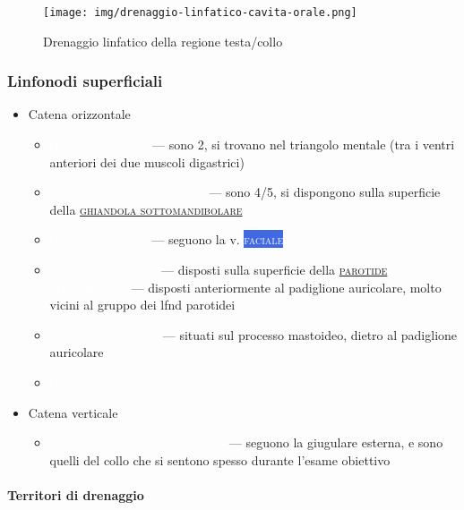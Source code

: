 \documentclass[italian,]{article}
\providecommand{\tightlist}{%
  \setlength{\itemsep}{0pt}\setlength{\parskip}{0pt}}
\newcommand{\ven}[1]{\colorbox{RoyalBlue}{\textcolor{white}{\textsc{#1}}}}
\newcommand{\lin}[1]{\colorbox{PineGreen}{\textcolor{white}{\textsc{#1}}}}
\renewcommand{\a}[1]{\underline{\textsc{#1}}}
\begin{document}
\begin{figure}
\centering
\texttt{[image: img/drenaggio-linfatico-cavita-orale.png]}
\caption{Drenaggio linfatico della regione testa/collo}
\end{figure}

\hypertarget{linfonodi-superficiali}{%
\subsubsection{Linfonodi superficiali}\label{linfonodi-superficiali}}

\begin{itemize}
\tightlist
\item
  Catena orizzontale

  \begin{itemize}
  \tightlist
  \item
    \lin{linfonodi mentali} --- sono 2, si trovano nel triangolo mentale
    (tra i ventri anteriori dei due muscoli digastrici)
  \item
    \lin{linfonodi sottomandibolari} --- sono 4/5, si dispongono sulla
    superficie della \a{ghiandola sottomandibolare}
  \item
    \lin{linfonodi buccali} --- seguono la v. \ven{faciale}
  \item
    \lin{linfonodi parotidei} --- disposti sulla superficie della
    \a{parotide} \lin{linfonodi preauricolari} --- disposti
    anteriormente al padiglione auricolare, molto vicini al gruppo dei
    lfnd parotidei
  \item
    \lin{linfonodi mastoidei} --- situati sul processo mastoideo, dietro
    al padiglione auricolare
  \item
    \lin{linfonodi occipitali}~
  \end{itemize}
\item
  Catena verticale

  \begin{itemize}
  \tightlist
  \item
    \lin{linfonodi cervicali superficiali} --- seguono la giugulare
    esterna, e sono quelli del collo che si sentono spesso durante
    l'esame obiettivo
  \end{itemize}
\end{itemize}

\hypertarget{territori-di-drenaggio}{%
\paragraph{Territori di drenaggio}\label{territori-di-drenaggio}}
\end{document}
